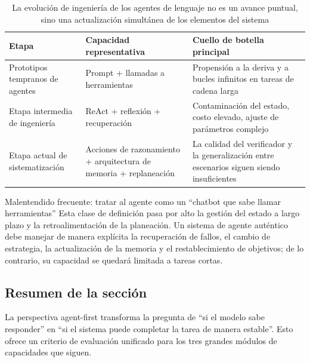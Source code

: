 \begin{table}[H]
\centering
\begin{tabular}{p{2.5cm}p{4.2cm}p{4.7cm}}
\toprule
\textbf{Etapa} & \textbf{Capacidad representativa} & \textbf{Cuello de botella principal} \\
\midrule
Prototipos tempranos de agentes & Prompt + llamadas a herramientas & Propensión a la deriva y a bucles infinitos en tareas de cadena larga \\
Etapa intermedia de ingeniería & ReAct + reflexión + recuperación & Contaminación del estado, costo elevado, ajuste de parámetros complejo \\
Etapa actual de sistematización & Acciones de razonamiento + arquitectura de memoria + replaneación & La calidad del verificador y la generalización entre escenarios siguen siendo insuficientes \\
\bottomrule
\end{tabular}
\caption{La evolución de ingeniería de los agentes de lenguaje no es un avance puntual, sino una actualización simultánea de los elementos del sistema}
\end{table}

\begin{warningbox}{Malentendido frecuente: tratar al agente como un ``chatbot que sabe llamar herramientas''}
Esta clase de definición pasa por alto la gestión del estado a largo plazo y la retroalimentación de la planeación. Un sistema de agente auténtico debe manejar de manera explícita la recuperación de fallos, el cambio de estrategia, la actualización de la memoria y el restablecimiento de objetivos; de lo contrario, su capacidad se quedará limitada a tareas cortas.
\end{warningbox}

\subsection{Resumen de la sección}

La perspectiva agent-first transforma la pregunta de ``si el modelo sabe responder'' en ``si el sistema puede completar la tarea de manera estable''. Esto ofrece un criterio de evaluación unificado para los tres grandes módulos de capacidades que siguen.

